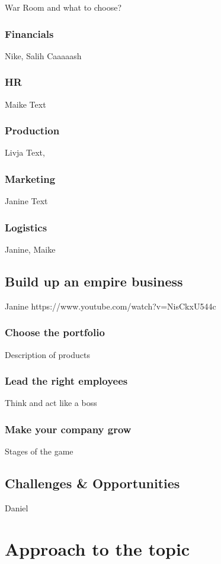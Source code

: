 \documentclass[11pt,titlepage,oneside,openany]{book}
\begin{document}
War Room and what to choose?
\subsection{Financials}
Nike, Salih
Caaaaash
\subsection{HR}
Maike
Text
\subsection{Production}
Livja
Text, 
\subsection{Marketing}
Janine
Text
\subsection{Logistics}
Janine, Maike

\section{Build up an empire business}
Janine
\label{sec:business}
https://www.youtube.com/watch?v=NisCkxU544c
\subsection{Choose the portfolio}

Description of products

\subsection{Lead the right employees}

Think and act like a boss

\subsection{Make your company grow}
Stages of the game


\section{Challenges \& Opportunities}
Daniel
\label{sec:evil}

\chapter{Approach to the topic}
\end{document}
